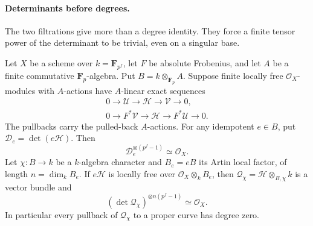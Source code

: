 \paragraph{Determinants before degrees.}
The two filtrations give more than a degree identity. They force a
finite tensor power of the determinant to be trivial, even on a
singular base.

\begin{proposition}\label{geo-frobenius-determinant-torsion}
Let $X$ be a scheme over $k=\mathbf F_{p^f}$, let $F$ be absolute
Frobenius, and let $A$ be a finite commutative $\mathbf F_p$-algebra.
Put $B=k\otimes_{\mathbf F_p}A$. Suppose finite locally free
$\mathcal O_X$-modules with $A$-actions have $A$-linear exact sequences
\begin{equation}\label{geo-hodge-conjugate-sequences}
\begin{gathered}
0\longrightarrow\mathcal U\longrightarrow\mathcal H
 \longrightarrow\mathcal V\longrightarrow0,\\
0\longrightarrow F^*\mathcal V\longrightarrow\mathcal H
 \longrightarrow F^*\mathcal U\longrightarrow0.
\end{gathered}
\end{equation}
The pullbacks carry the pulled-back $A$-actions. For any idempotent
$e\in B$, put $\mathcal D_e=\det(e\mathcal H)$. Then
\[
                    \mathcal D_e^{\otimes(p^f-1)}
                         \simeq\mathcal O_X.
\]
Let $\chi:B\to k$ be a $k$-algebra character and $B_e=eB$ its
Artin local factor, of length $n=\dim_k B_e$. If $e\mathcal H$ is
locally free over $\mathcal O_X\otimes_k B_e$, then
$\mathcal Q_\chi=\mathcal H\otimes_{B,\chi}k$ is a vector bundle and
\begin{equation}\label{geo-character-determinant-torsion}
       (\det\mathcal Q_\chi)^{\otimes n(p^f-1)}
                             \simeq\mathcal O_X.
\end{equation}
In particular every pullback of $\mathcal Q_\chi$ to a proper curve
has degree zero.
\end{proposition}
